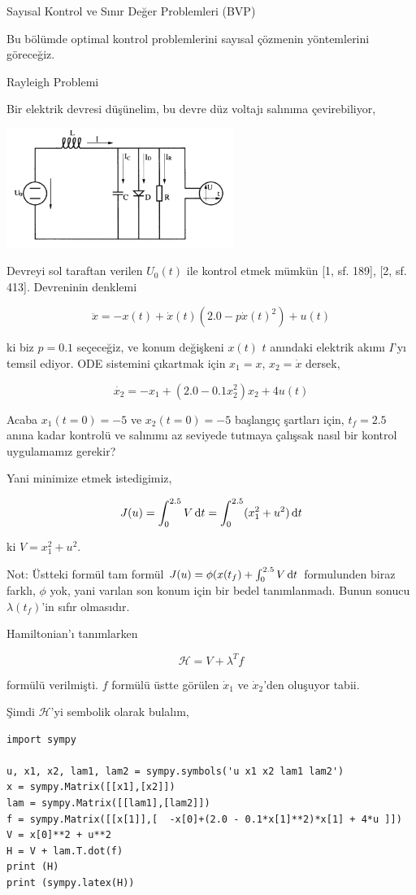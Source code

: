 \documentclass[12pt,fleqn]{article}\usepackage{../../common}
\begin{document}
Sayısal Kontrol ve Sınır Değer Problemleri (BVP)

Bu bölümde optimal kontrol problemlerini sayısal çözmenin yöntemlerini
göreceğiz. 

Rayleigh Problemi

Bir elektrik devresi düşünelim, bu devre düz voltajı salınıma çevirebiliyor, 

\includegraphics[width=20em]{phy_num_01.png}

Devreyi sol taraftan verilen $U_0(t)$ ile kontrol etmek mümkün [1,
sf. 189], [2, sf. 413]. Devreninin denklemi

$$
\ddot{x} = -x(t) + \dot{x}(t) ( 2.0 - p \dot{x}(t)^2 ) +  u(t)
$$

ki biz $p = 0.1$ seçeceğiz, ve konum değişkeni $x(t)$ $t$ anındaki elektrik
akımı $I$'yı temsil ediyor. ODE sistemini çıkartmak için $x_1 = x$,
$x_2 = \dot{x}$ dersek,

$$
\dot{x_2} = -x_1 + (2.0 - 0.1 x_2^2)x_2 + 4 u(t)
$$

Acaba $x_1(t=0)=-5$ ve $x_2(t=0)=-5$ başlangıç şartları için,
$t_f=2.5$ anına kadar kontrolü ve salınımı az seviyede tutmaya
çalışsak nasıl bir kontrol uygulamamız gerekir?

Yani minimize etmek istedigimiz, 

$$
J(u) = \int_{0}^{2.5} V  \,\mathrm{d} t = \int_{0}^{2.5} (x_1^2 + u^2)  \,\mathrm{d} t
$$

ki $V = x_1^2 + u^2$.

Not: Üstteki formül tam formül $J(u) = \phi(x(t_f) + \int_{0}^{2.5} V  \,\mathrm{d}
t$ formulunden biraz farklı, $\phi$ yok, yani varılan son konum için bir
bedel tanımlanmadı. Bunun sonucu $\lambda(t_f)$'in sıfır olmasıdır.

Hamiltonian'ı tanımlarken

$$
\mathcal{H} = V + \lambda^T f
$$

formülü verilmişti. $f$ formülü üstte görülen $\dot{x}_1$ ve
$\dot{x}_2$'den oluşuyor tabii.

Şimdi $\mathcal{H}$'yi sembolik olarak bulalım,

\begin{verbatim}
import sympy

u, x1, x2, lam1, lam2 = sympy.symbols('u x1 x2 lam1 lam2')
x = sympy.Matrix([[x1],[x2]])
lam = sympy.Matrix([[lam1],[lam2]])
f = sympy.Matrix([[x[1]],[  -x[0]+(2.0 - 0.1*x[1]**2)*x[1] + 4*u ]])
V = x[0]**2 + u**2
H = V + lam.T.dot(f)
print (H)
print (sympy.latex(H))
\end{verbatim}
\end{document}

